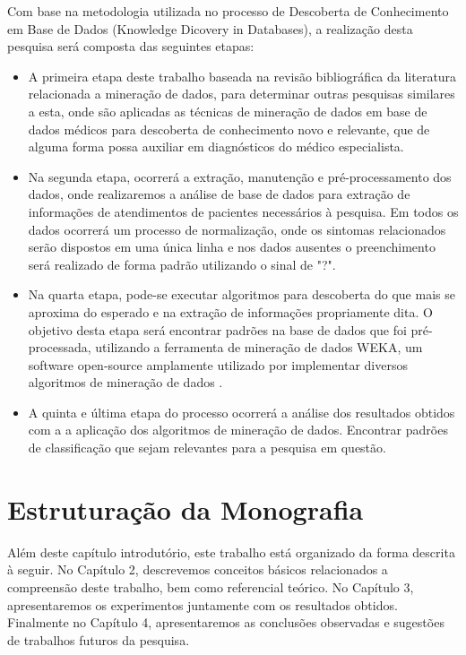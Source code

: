 \documentclass[
	12pt,				%
	openright,			%
	oneside,	
	a4paper,				%
	english,				%
	brazil				%
]{abntex2/abntex2} %
\begin{document}
		Com base na metodologia utilizada no processo de Descoberta de Conhecimento em Base de Dados (Knowledge Dicovery in Databases), a realização desta pesquisa será composta das seguintes etapas:
		
		\begin{itemize}
			\item A primeira etapa deste trabalho baseada na revisão bibliográfica da literatura relacionada a mineração de dados, para determinar outras pesquisas similares a esta, onde são aplicadas as técnicas de mineração de dados em base de dados médicos para descoberta de conhecimento novo e relevante, que de alguma forma possa auxiliar em diagnósticos do médico especialista.
			
			\item Na segunda etapa, ocorrerá a extração, manutenção e pré-processamento dos dados, onde realizaremos a análise de base de dados para extração de informações de atendimentos de pacientes necessários à pesquisa. Em todos os dados ocorrerá um processo de normalização, onde os sintomas relacionados serão dispostos em uma única linha e nos dados ausentes o preenchimento será realizado de forma padrão utilizando o sinal de "?".
			
			\item Na quarta etapa, pode-se executar algoritmos para descoberta do que mais se aproxima do esperado e na extração de informações propriamente dita. O objetivo desta etapa será encontrar padrões na base de dados que foi pré-processada, utilizando a ferramenta de mineração de dados WEKA, um software open-source amplamente utilizado por implementar diversos algoritmos de mineração de dados \cite{hall:2009}.
			
			\item A quinta e última etapa do processo ocorrerá a análise dos resultados obtidos com a a aplicação dos algoritmos de mineração de dados. Encontrar padrões de classificação que sejam relevantes para a pesquisa em questão.
			
		\end{itemize}
		
	\section{Estruturação da Monografia}
	
		Além deste capítulo introdutório, este trabalho está organizado da forma descrita à seguir. No Capítulo 2, descrevemos conceitos básicos relacionados a compreensão deste trabalho, bem como referencial teórico. No Capítulo 3, apresentaremos os experimentos juntamente com os resultados obtidos. Finalmente no Capítulo 4, apresentaremos as conclusões observadas e sugestões de trabalhos futuros da pesquisa.
\end{document}
